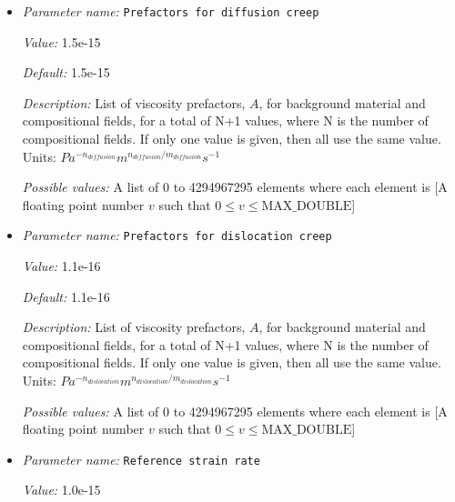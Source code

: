 \begin{itemize}
{\it Default:} 1e17


{\it Description:} Lower cutoff for effective viscosity. Units: $Pa s$


{\it Possible values:} A floating point number $v$ such that $0 \leq v \leq \text{MAX\_DOUBLE}$
\item {\it Parameter name:} {\tt Prefactors for diffusion creep}
\label{parameters:Material model/Visco Plastic/Prefactors for diffusion creep}


{\it Value:} 1.5e-15


{\it Default:} 1.5e-15


{\it Description:} List of viscosity prefactors, $A$, for background material and compositional fields, for a total of N+1 values, where N is the number of compositional fields. If only one value is given, then all use the same value. Units: $Pa^{-n_{diffusion}} m^{n_{diffusion}/m_{diffusion}} s^{-1}$


{\it Possible values:} A list of 0 to 4294967295 elements where each element is [A floating point number $v$ such that $0 \leq v \leq \text{MAX\_DOUBLE}$]
\item {\it Parameter name:} {\tt Prefactors for dislocation creep}
\label{parameters:Material model/Visco Plastic/Prefactors for dislocation creep}


{\it Value:} 1.1e-16


{\it Default:} 1.1e-16


{\it Description:} List of viscosity prefactors, $A$, for background material and compositional fields, for a total of N+1 values, where N is the number of compositional fields. If only one value is given, then all use the same value. Units: $Pa^{-n_{dislocation}} m^{n_{dislocation}/m_{dislocation}} s^{-1}$


{\it Possible values:} A list of 0 to 4294967295 elements where each element is [A floating point number $v$ such that $0 \leq v \leq \text{MAX\_DOUBLE}$]
\item {\it Parameter name:} {\tt Reference strain rate}
\label{parameters:Material model/Visco Plastic/Reference strain rate}


{\it Value:} 1.0e-15



\end{itemize}
